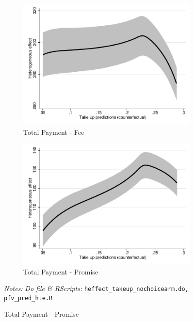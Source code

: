 \documentclass[11pt]{article}
\begin{document}
\begin{figure}[H]
\begin{center}
        \begin{subfigure}{0.45\textwidth}
        \caption{Total Payment - Fee}
        \centering
        \includegraphics[width=\textwidth]{Figuras/takeup_he_pro_2_pago_frec_vol_fee_sum_p_c.pdf}
    \end{subfigure}
    \begin{subfigure}{0.45\textwidth}
        \caption{Total Payment - Promise}
        \centering
        \includegraphics[width=\textwidth]{Figuras/takeup_he_pro_3_pago_frec_vol_fee_sum_p_c.pdf}
    \end{subfigure}    
    
    
    \end{center}
     \footnotesize \textit{Notes: } 
      \footnotesize{ \textit{Do file \& RScripts: }  \texttt{heffect\_takeup\_nochoicearm.do, pfv\_pred\_hte.R}}
\end{figure}
\end{document}
